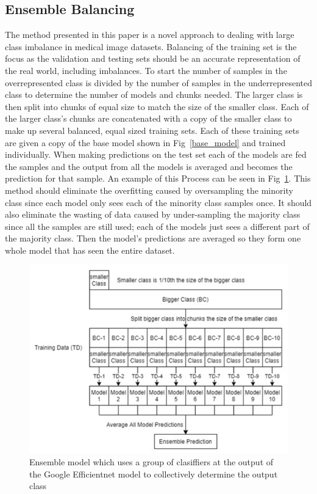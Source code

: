 \documentclass[conference]{IEEEtran}
\begin{document}
\subsection{Ensemble Balancing}
\label{section:ensemble_balancing}
The method presented in this paper is a novel approach to dealing with large
class imbalance in medical image datasets. Balancing of the training set is the
focus as the validation and testing sets should be an accurate representation
of the real world, including imbalances. To start the number of samples in the
overrepresented class is divided by the number of samples in the
underrepresented class to determine the number of models and chunks needed.
The larger class is then split into chunks of equal size to match the size of
the smaller class. Each of the larger class’s chunks are concatenated with a
copy of the smaller class to make up several balanced, equal sized training
sets. Each of these training sets are given a copy of the base model shown in
Fig~\ref{base_model} and trained individually. When making predictions on the test set
each of the models are fed the samples and the output from all the models is
averaged and becomes the prediction for that sample.  An example of this
Process can be seen in Fig~\ref{ensemble_model}. This method should eliminate the
overfitting caused by oversampling the minority class since each model only
sees each of the minority class samples once. It should also eliminate the
wasting of data caused by under-sampling the majority class since all the
samples are still used; each of the models just sees a different part of the
majority class. Then the model’s predictions are averaged so they form one
whole model that has seen the entire dataset.
\begin{figure}[bp]
  \centering
  \includegraphics[scale=0.3]{ensemble_model.png}
  \caption{Ensemble model which uses a group of clasiffiers at the output of
    the Google Efficientnet model to collectively determine the output class}
  \label{ensemble_model}
\end{figure}
\end{document}
